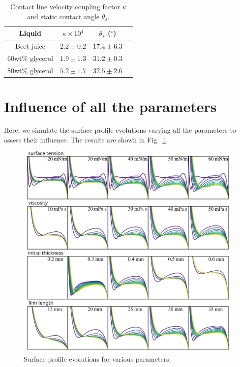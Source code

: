 \documentclass[aps,preprint]{revtex4-2}
\begin{document}
\begin{table}[ht]
    \centering
    \begin{tabular}{cccc}
    \hline
    Liquid          & $\kappa\times 10^{4}$ & $\theta_s$ ($^\circ$) \\
    \hline
    Beet juice      & $2.2\pm 0.2$            & $17.4\pm 6.3$           \\
    60wt\% glycerol & $1.9\pm 1.3$            & $31.2\pm 0.3$          \\
    80wt\% glycerol & $5.2\pm 1.7$            & $32.5\pm 2.6$           \\
    \hline
    \end{tabular}
    \caption{
    Contact line velocity coupling factor $\kappa$ and static contact angle $\theta_s$.
    }
    \label{tab:contact-line-dynamics}
\end{table}

\newpage

\section{Influence of all the parameters}

Here, we simulate the surface profile evolutions varying all the parameters to assess their influence. The results are shown in Fig.~\ref{fig:all-parameters-influence}.

\begin{figure}[ht]
    \centering
    \includegraphics[width=\linewidth]{Figures/all_parameter_effects.png}
    \caption{
    Surface profile evolutions for various parameters.
    }
    \label{fig:all-parameters-influence}
\end{figure}
\end{document}
